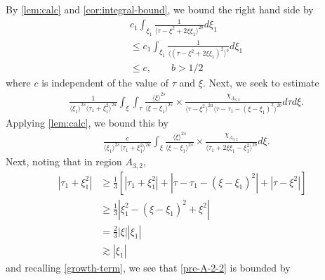 \documentclass[12pt,reqno]{amsart}
\numberwithin{equation}{section}  %
\begin{document}
By \cref{lem:calc} and \cref{cor:integral-bound}, we bound the right hand
side by
%
%
\begin{equation*}
\begin{split}
  & c_{1} \int_{\xi_{1}}  \frac{1}{\langle \tau - \xi^{2} + 2 \xi \xi_{1} 
  \rangle^{2b} }d \xi_{1}
  \\
  & \le c_{1} \int_{\xi_{1}}  \frac{1}{ \langle (\tau - \xi^{2} + 2 \xi
  \xi_{1})^{2} \rangle^{b}}d \xi_{1}
  \\
  & \le  c, \qquad b > 1/2
\end{split}
\end{equation*}
where $c$ is independent of the value of $\tau$ and $\xi$. 
Next, we seek to estimate
\begin{equation*}
\begin{split}
  &  \frac{1}{\langle \xi_{1} \rangle ^{2s}
  \langle \tau_{1} + \xi_{1}^{2}  \rangle
  ^{2a}} \int_{\xi} \int_{\tau} \frac{\langle \xi \rangle ^{2s}}{\langle
  \xi - \xi_{1}\rangle ^{2s}}  \times \frac{\chi_{A_{3,2}}}{\langle
  \tau - \xi^{2} \rangle ^{2a} \langle \tau - \tau_{1} - (\xi -
  \xi_{1})^{2} \rangle^{2b} } d \tau d \xi.
\end{split}
\end{equation*}
Applying \cref{lem:calc}, we bound this by
%
%
\begin{equation}
  \label{pre-A-2-2}
\begin{split}
  &  \frac{c}{\langle \xi_{1} \rangle ^{2s}
  \langle \tau_{1} + \xi_{1}^{2}  \rangle
  ^{2a}} \int_{\xi} \frac{\langle \xi \rangle ^{2s}}{\langle
  \xi - \xi_{1}\rangle ^{2s}}  \times \frac{\chi_{A_{3,2}}}{\langle
  \tau_{1} + 2 \xi \xi_{1} - \xi_{1}^{2} \rangle^{2b} } d \xi.
\end{split}
\end{equation}
%
Next, noting that in region $A_{3,2}$,
%
%
\begin{equation}
\begin{split}
  | \tau_{1} + \xi_{1}^{2} |
  & \ge \frac{1}{3} \left[ | \tau_{1} + \xi_{1}^{2} | + | \tau - \tau_{1} -
  (\xi - \xi_{1})^{2} | + | \tau - \xi^{2} | \right]
  \\
  & \ge \frac{1}{3} | \xi_{1}^{2} - (\xi - \xi_{1})^{2} + \xi^{2} |
  \\
  & = \frac{2}{3}| \xi | | \xi_{1} |
  \\
  & \gtrsim  | \xi_{1} |
\end{split}
\label{case-2-region-A-2-2-key-est}
\end{equation}
%
%
and recalling \eqref{growth-term}, we see that \eqref{pre-A-2-2} is bounded by
\end{document}
